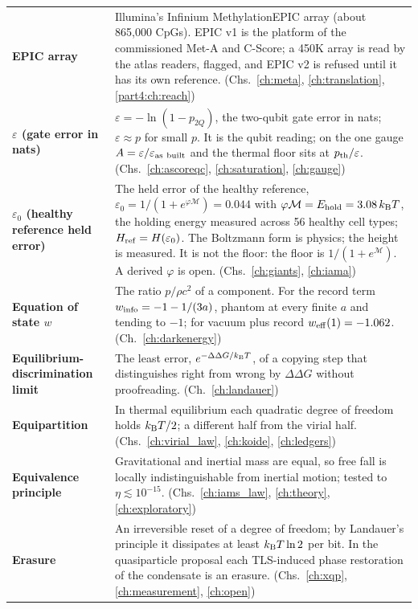 {\begin{longtable}{@{}>{\raggedright\arraybackslash}p{}>{\raggedright\arraybackslash}p{}@{}}
\textbf{EPIC array} & Illumina's Infinium MethylationEPIC array (about 865,000 CpGs). EPIC v1 is the platform of the commissioned Met-A and C-Score; a 450K array is read by the atlas readers, flagged, and EPIC v2 is refused until it has its own reference. {\footnotesize(Chs.~\ref{ch:meta}, \ref{ch:translation}, \ref{part4:ch:reach})}\\[1pt]
\textbf{$\varepsilon$ (gate error in nats)} & $\varepsilon=-\ln(1-p_{2Q})$, the two-qubit gate error in nats; $\varepsilon\approx p$ for small $p$. It is the qubit reading; on the one gauge $A=\varepsilon/\varepsilon_{\rm as\ built}$ and the thermal floor sits at $p_{\rm th}/\varepsilon$. {\footnotesize(Chs.~\ref{ch:ascoreqc}, \ref{ch:saturation}, \ref{ch:gauge})}\\[1pt]
\textbf{$\varepsilon_0$ (healthy reference held error)} & The held error of the healthy reference, $\varepsilon_0=1/(1+e^{\varphi\mathcal M})=0.044$ with $\varphi\mathcal M=E_{\rm hold}=3.08\,k_{\mathrm B} T$, the holding energy measured across 56 healthy cell types; $H_{\rm ref}=H(\varepsilon_0)$. The Boltzmann form is physics; the height is measured. It is not the floor: the floor is $1/(1+e^{\mathcal M})$. A derived $\varphi$ is open. {\footnotesize(Chs.~\ref{ch:giants}, \ref{ch:iama})}\\[1pt]
\textbf{Equation of state $w$} & The ratio $p/\rho c^2$ of a component. For the record term $w_{\rm info}=-1-1/(3a)$, phantom at every finite $a$ and tending to $-1$; for vacuum plus record $w_{\rm eff}(1)=-1.062$. {\footnotesize(Ch.~\ref{ch:darkenergy})}\\[1pt]
\textbf{Equilibrium-discrimination limit} & The least error, $e^{-\Delta\Delta G/k_{\mathrm B} T}$, of a copying step that distinguishes right from wrong by $\Delta\Delta G$ without proofreading. {\footnotesize(Ch.~\ref{ch:landauer})}\\[1pt]
\textbf{Equipartition} & In thermal equilibrium each quadratic degree of freedom holds $k_{\mathrm B} T/2$; a different half from the virial half. {\footnotesize(Chs.~\ref{ch:virial_law}, \ref{ch:koide}, \ref{ch:ledgers})}\\[1pt]
\textbf{Equivalence principle} & Gravitational and inertial mass are equal, so free fall is locally indistinguishable from inertial motion; tested to $\eta\lesssim10^{-15}$. {\footnotesize(Chs.~\ref{ch:iams_law}, \ref{ch:theory}, \ref{ch:exploratory})}\\[1pt]
\textbf{Erasure} & An irreversible reset of a degree of freedom; by Landauer's principle it dissipates at least $k_{\mathrm B} T\ln2$ per bit. In the quasiparticle proposal each TLS-induced phase restoration of the condensate is an erasure. {\footnotesize(Chs.~\ref{ch:xqp}, \ref{ch:measurement}, \ref{ch:open})}\\[1pt]

\end{longtable}}
